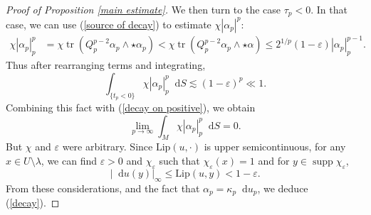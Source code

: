 \documentclass[reqno,11pt]{amsart}
\newcommand*\dif{\mathop{}\!\mathrm{d}}
\DeclareMathOperator{\supp}{supp}
\DeclareMathOperator{\tr}{tr}
\newcommand{\Lip}{\mathrm{Lip}}
\theoremstyle{definition}
\numberwithin{equation}{section}
\begin{document}
\begin{proof}[Proof of Proposition \ref{main estimate}]
We then turn to the case $\tau_p < 0$.
In that case, we can use (\ref{source of decay}) to estimate $\chi |\alpha_p|^p$:
\begin{align*}
\chi |\alpha_p|_p^p &= \chi \tr(Q_p^{p - 2} \alpha_p \wedge \star \alpha_p) < \chi \tr(Q_p^{p - 2} \alpha_p \wedge \star \alpha) \leq 2^{1/p} (1 - \varepsilon) |\alpha_p|_p^{p - 1}.
\end{align*}
Thus after rearranging terms and integrating,
$$\int_{\{t_p < 0\}} \chi |\alpha_p|_p^p \dif S \lesssim (1 - \varepsilon)^p \ll 1.$$
Combining this fact with (\ref{decay on positive}), we obtain 
$$\lim_{p \to \infty} \int_M \chi |\alpha_p|_p^p \dif S = 0.$$
But $\chi$ and $\varepsilon$ were arbitrary.
Since $\Lip(u, \cdot)$ is upper semicontinuous, for any $x \in U \setminus \lambda$, we can find $\varepsilon > 0$ and $\chi_\varepsilon$ such that $\chi_\varepsilon(x) = 1$ and for $y \in \supp \chi_\varepsilon$,
$$|\dif u(y)|_\infty \leq \Lip(u, y) < 1 - \varepsilon.$$
From these considerations, and the fact that $\alpha_p = \kappa_p \dif u_p$, we deduce (\ref{decay}).
\end{proof}

\end{document}

